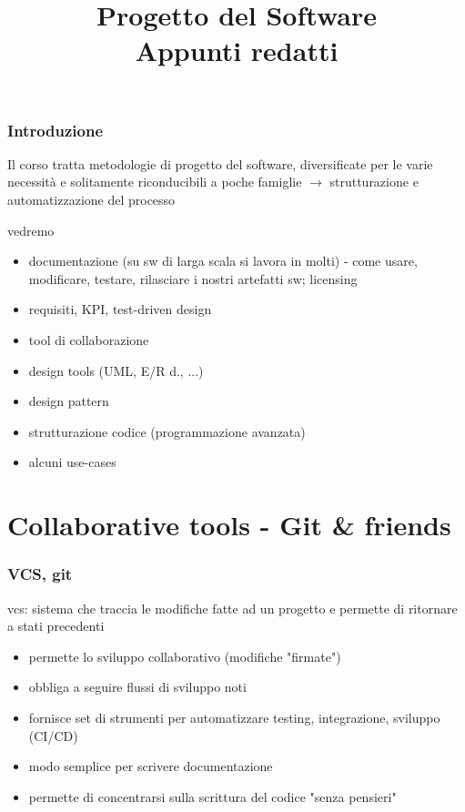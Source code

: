 

\title{%
  Progetto del Software\\
\large Appunti redatti}


\maketitle
\tableofcontents
\newpage

\section*{Introduzione}

Il corso tratta metodologie di progetto del software, diversificate per le varie necessit\`a e solitamente riconducibili a poche famiglie $\rightarrow$ strutturazione e automatizzazione del processo

vedremo
\begin{itemize}
  \item documentazione (su sw di larga scala si lavora in molti) - come usare, modificare, testare, rilasciare i nostri artefatti sw; licensing
  \item requisiti, KPI, test-driven design
  \item tool di collaborazione
  \item design tools (UML, E/R d., ...)
  \item design pattern
  \item strutturazione codice (programmazione avanzata)
  \item alcuni use-cases
\end{itemize}

\newpage
\part{Collaborative tools - Git \& friends}
\section{VCS, git}

vcs: sistema che traccia le modifiche fatte ad un progetto e permette di ritornare a stati precedenti
\begin{itemize}
  \item permette lo sviluppo collaborativo (modifiche "firmate")
  \item obbliga a seguire flussi di sviluppo noti
  \item fornisce set di strumenti per automatizzare testing, integrazione, sviluppo (CI/CD)
  \item modo semplice per scrivere documentazione
  \item permette di concentrarsi sulla scrittura del codice "senza pensieri"
\end{itemize}

